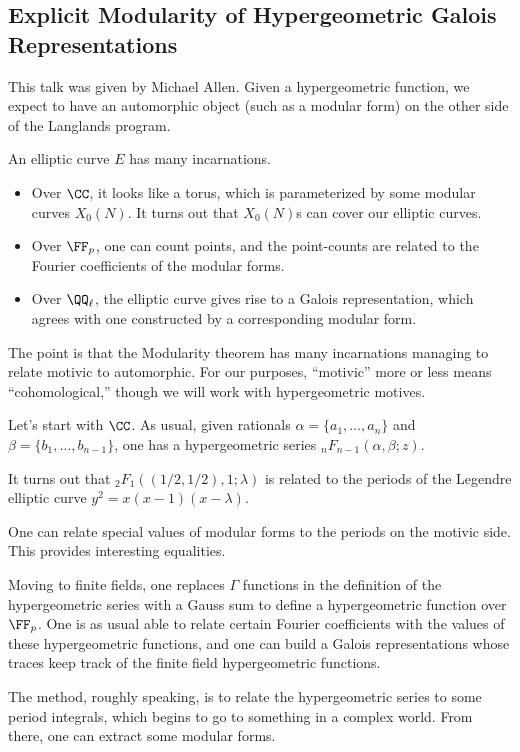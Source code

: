 \documentclass{article}
\begin{document}
\subsection{Explicit Modularity of Hypergeometric Galois Representations}
This talk was given by Michael Allen. Given a hypergeometric function, we expect to have an automorphic object (such as a modular form) on the other side of the Langlands program.
\begin{example}
	An elliptic curve $E$ has many incarnations.
	\begin{itemize}
		\item Over $\CC$, it looks like a torus, which is parameterized by some modular curves $X_0(N)$. It turns out that $X_0(N)$s can cover our elliptic curves.
		\item Over $\FF_p$, one can count points, and the point-counts are related to the Fourier coefficients of the modular forms.
		\item Over $\QQ_\ell$, the elliptic curve gives rise to a Galois representation, which agrees with one constructed by a corresponding modular form.
	\end{itemize}
\end{example}
The point is that the Modularity theorem has many incarnations managing to relate motivic to automorphic. For our purposes, ``motivic'' more or less means ``cohomological,'' though we will work with hypergeometric motives.

Let's start with $\CC$. As usual, given rationals $\alpha=\{a_1,\ldots,a_n\}$ and $\beta=\{b_1,\ldots,b_{n-1}\}$, one has a hypergeometric series $_nF_{n-1}(\alpha,\beta;z)$.
\begin{example}
	It turns out that $_2F_1((1/2,1/2),1;\lambda)$ is related to the periods of the Legendre elliptic curve $y^2=x(x-1)(x-\lambda)$.
\end{example}
\begin{remark}
	One can relate special values of modular forms to the periods on the motivic side. This provides interesting equalities.
\end{remark}
Moving to finite fields, one replaces $\Gamma$ functions in the definition of the hypergeometric series with a Gauss sum to define a hypergeometric function over $\FF_p$. One is as usual able to relate certain Fourier coefficients with the values of these hypergeometric functions, and one can build a Galois representations whose traces keep track of the finite field hypergeometric functions.
\begin{remark}
	The method, roughly speaking, is to relate the hypergeometric series to some period integrals, which begins to go to something in a complex world. From there, one can extract some modular forms.
\end{remark}
\end{document}
